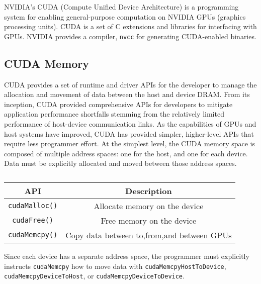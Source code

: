 NVIDIA's CUDA (Compute Unified Device Architecture) is a programming system for enabling general-purpose computation on NVIDIA GPUs (graphics processing units).
CUDA is a set of C extensions and libraries for interfacing with GPUs.
NVIDIA provides a compiler, \texttt{nvcc} for generating CUDA-enabled binaries.

\subsection{CUDA Memory}

CUDA provides a set of runtime and driver APIs for the developer to manage the allocation and movement of data between the host and device DRAM.
From its inception, CUDA provided comprehensive APIs for developers to mitigate application performance shortfalls stemming from the relatively limited performance of host-device communication links.
As the capabilities of GPUs and host systems have improved, CUDA has provided simpler, higher-level APIs that require less programmer effort.
At the simplest level, the CUDA memory space is composed of multiple address spaces: one for the host, and one for each device.
Data must be explicitly allocated and moved between those address spaces.

\begin{table}[h]
    \centering
    \caption[CUDA Basic Memory-management APIs]{}
    \label{tab:cuda-basic-apis}
    \begin{tabular}{|c|c|}
    \hline
    \textbf{API}    & \textbf{Description}                             \\ \hline
    \texttt{cudaMalloc()} & Allocate memory on the device              \\ \hline
    \texttt{cudaFree()}   & Free memory on the device                  \\ \hline
    \texttt{cudaMemcpy()} & Copy data between to,from,and between GPUs \\ \hline
    \end{tabular}
\end{table}

Since each device has a separate address space, the programmer must explicitly instructs \texttt{cudaMemcpy} how to move data with \texttt{cudaMemcpyHostToDevice}, \texttt{cudaMemcpyDeviceToHost}, or \texttt{cudaMemcpyDeviceToDevice}.

